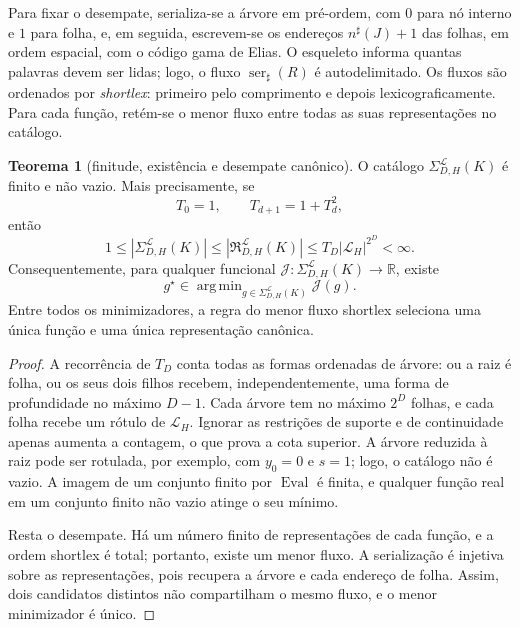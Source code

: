 \documentclass[12pt,a4paper]{article}
\theoremstyle{preciso}
\theoremstyle{definition}
\newcommand{\Library}{\mathcal{L}}
\DeclareMathOperator*{\argmin}{arg\,min}
\theoremstyle{preciso}
\newtheorem{theorem}[teorema]{Teorema}
\theoremstyle{preciso}
\theoremstyle{preciso}
\theoremstyle{preciso}
\theoremstyle{definition}
\theoremstyle{preciso}
\theoremstyle{definition}
\theoremstyle{preciso}
\theoremstyle{preciso}
\theoremstyle{definition}
\begin{document}
Para fixar o desempate, serializa-se a árvore em pré-ordem, com $0$ para nó
interno e $1$ para folha, e, em seguida, escrevem-se os endereços
$n^\sharp(J)+1$ das folhas, em ordem espacial, com o código gama de Elias. O
esqueleto informa quantas palavras devem ser lidas; logo, o fluxo
$\operatorname{ser}_\sharp(R)$ é autodelimitado. Os fluxos são ordenados por
\emph{shortlex}: primeiro pelo comprimento e depois lexicograficamente. Para
cada função, retém-se o menor fluxo entre todas as suas representações no
catálogo.

\begin{theorem}[finitude, existência e desempate canônico]\label{map:artigo_2:3.23}
\label{artigo_2:thm:finite-catalog-minimizer}
O catálogo $\Sigma_{D,H}^{\Library}(K)$ é finito e não vazio. Mais
precisamente, se
\[
 T_0=1,\qquad T_{d+1}=1+T_d^2,
\]
então
\begin{equation}
 1\le |\Sigma_{D,H}^{\Library}(K)|
 \le |\mathfrak R_{D,H}^{\Library}(K)|
 \le T_D|\Library_H|^{2^D}<\infty.
 \label{artigo_2:eq:finite-catalog-bound}
\end{equation}
Consequentemente, para qualquer funcional
$\mathcal J:\Sigma_{D,H}^{\Library}(K)\to\mathbb R$, existe
\begin{equation}
 g^\star\in\argmin_{g\in\Sigma_{D,H}^{\Library}(K)}\mathcal J(g).
 \label{artigo_2:eq:finite-argmin}
\end{equation}
Entre todos os minimizadores, a regra do menor fluxo shortlex seleciona uma
única função e uma única representação canônica.
\end{theorem}

\begin{proof}
A recorrência de $T_D$ conta todas as formas ordenadas de árvore: ou a raiz é
folha, ou os seus dois filhos recebem, independentemente, uma forma de profundidade
no máximo $D-1$. Cada árvore tem no máximo $2^D$ folhas, e cada folha recebe
um rótulo de $\Library_H$. Ignorar as restrições de suporte e de continuidade
apenas aumenta a contagem, o que prova a cota superior. A árvore reduzida à raiz pode
ser rotulada, por exemplo, com $y_0=0$ e $s=1$; logo, o catálogo não é vazio.
A imagem de um conjunto finito por $\operatorname{Eval}$ é finita, e qualquer
função real em um conjunto finito não vazio atinge o seu mínimo.

Resta o desempate. Há um número finito de representações de cada função, e a
ordem shortlex é total; portanto, existe um menor fluxo. A serialização é
injetiva sobre as representações, pois recupera a árvore e cada endereço de
folha. Assim, dois candidatos distintos não compartilham o mesmo fluxo, e o
menor minimizador é único.
\end{proof}
\end{document}
